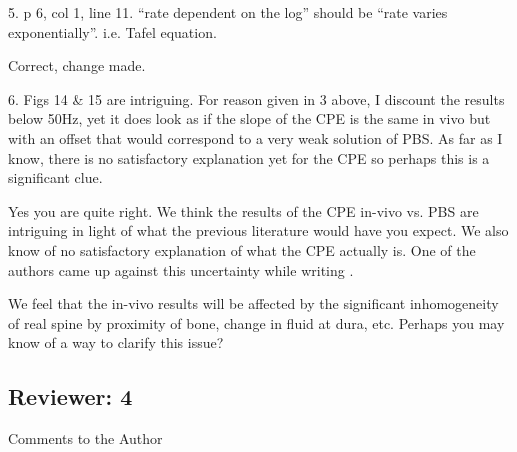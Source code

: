 \documentclass[journal, a4paper]{IEEEtran}
\begin{document}
{    5. p 6, col 1, line 11. ``rate dependent on the log'' should be ``rate varies exponentially''. i.e. Tafel equation.

    {
        \color{blue}
        Correct, change made.
    }

    6. Figs 14 \& 15 are intriguing. For reason given in 3 above, I discount the results below 50Hz, yet it does look as if the slope of the CPE is the same in vivo but with an offset that would correspond to a very weak solution of PBS. As far as I know, there is no satisfactory explanation yet for the CPE so perhaps this is a significant clue.

    {
        \color{blue}
        Yes you are quite right. We think the results of the CPE in-vivo vs. PBS are intriguing in light of what the previous literature would have you expect. We also know of no satisfactory explanation of what the CPE actually is. One of the authors came up against this uncertainty while writing \cite{ScottSingle2013}.

        We feel that the in-vivo results will be affected by the significant inhomogeneity of real spine by proximity of bone, change in fluid at dura, etc. Perhaps you may know of a way to clarify this issue?
    }

}

\subsection*{Reviewer: 4}

Comments to the Author
\end{document}
